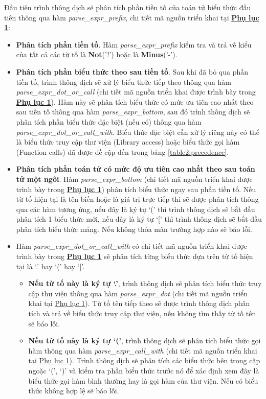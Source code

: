 Đầu tiên trình thông dịch sẽ phân tích phần tiền tố của toán tử biểu thức đầu tiên thông qua hàm \textit{parse\_expr\_prefix}, chi tiết mã nguồn triển khai tại \hyperref[ap1:expr_prefix]{\bf Phụ lục 1}:
\begin{itemize}
    \item \textbf{Phân tích phần tiền tố}. Hàm \textit{parse\_expr\_prefix} kiểm tra và trả về kiểu của tất cả các từ tố là \textbf{Not}('!') hoặc là \textbf{Minus}('-').
    \item \textbf{Phân tích phần biểu thức theo sau tiền tố}. Sau khi đã bỏ qua phần tiền tố, trình thông dịch sẽ xử lý biểu thức tiếp theo thông qua hàm \textit{parse\_expr\_dot\_or\_call} (chi tiết mã nguồn triển khai được trình bày trong \hyperref[ap1:expr_dot_or_call]{\bf Phụ lục 1}). Hàm này sẽ phân tích biểu thức có mức ưu tiên cao nhất theo sau tiền tố thông qua hàm \textit{parse\_expr\_bottom}, sau đó trình thông dịch sẽ phân tích phần biểu thức đặc biệt (nếu có) thông qua hàm \textit{parse\_expr\_dot\_or\_call\_with}. Biểu thức đặc biệt cần xử lý riêng này có thể là biểu thức truy cập thư viện (Library access) hoặc biểu thức gọi hàm (Function calls) đã được đề cập đến trong bảng \ref{table2:precedence}.
    \item \textbf{Phân tích phần toán tử có mức độ ưu tiên cao nhất theo sau toán tử một ngôi}. Hàm \textit{parse\_expr\_bottom} (chi tiết mã nguồn triển khai được trình bày trong \hyperref[ap1:expr_bottom]{\bf Phụ lục 1}) phân tích biểu thức ngay sau phần tiền tố. Nếu từ tố hiện tại là tên biến hoặc là giá trị trực tiếp thì sẽ được phân tích thông qua các hàm tương ứng, nếu đây là ký tự `(' thì trình thông dịch sẽ bắt đầu phân tích 1 biểu thức mới, nếu đây là ký tự `[' thì trình thông dịch sẽ bắt đầu phân tích biểu thức mảng. Nếu không thỏa mãn trường hợp nào sẽ báo lỗi.
    \item Hàm \textit{parse\_expr\_dot\_or\_call\_with} có chi tiết mã nguồn triển khai được trình bày trong \hyperref[ap1:expr_dot_or_call_with]{\bf Phụ lục 1} sẽ phân tích từng biểu thức dựa trên từ tố hiện tại là `.' hay `(' hay `['.
    \begin{itemize}
        \item \textbf{Nếu từ tố này là ký tự `.'}, trình thông dịch sẽ phân tích biểu thức truy cập thư viện thông qua hàm \textit{parse\_expr\_dot} (chi tiết mã nguồn triển khai tại \hyperref[ap1:expr_dot]{Phụ lục 1}). Từ tố tên tiếp theo sẽ được trình thông dịch phân tích và trả về biểu thức truy cập thư viện, nếu không tìm thấy từ tố tên sẽ báo lỗi.
        \item \textbf{Nếu từ tố này là ký tự `('}, trình thông dịch sẽ phân tích biểu thức gọi hàm thông qua hàm \textit{parse\_expr\_call\_with} (chi tiết mã nguồn triển khai tại \hyperref[ap1:expr_call_with]{Phụ lục 1}). Trình thông dịch sẽ phân tích các biểu thức bên trong cặp ngoặc `(', `)' và kiểm tra phần biểu thức trước nó để xác định xem đây là biểu thức gọi hàm bình thường hay là gọi hàm của thư viện. Nếu có biểu thức không hợp lệ sẽ báo lỗi.

\end{itemize}
\end{itemize}
